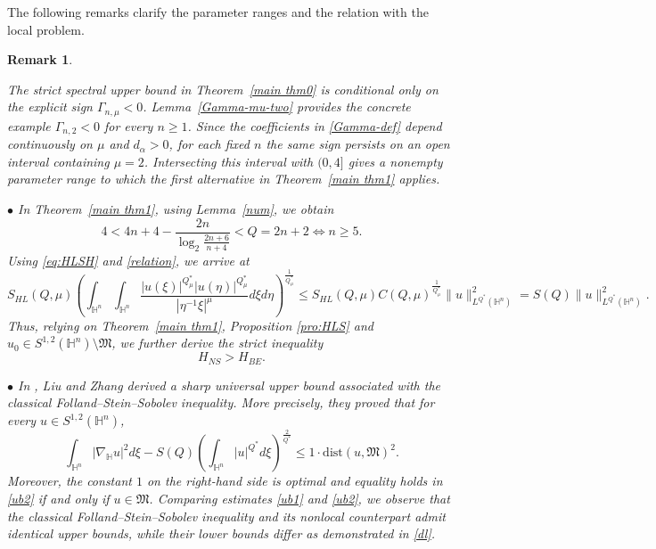 \documentclass[10pt,a4paper]{amsart}
\newtheorem{remark}{Remark}[section]
\begin{document}
{The following remarks clarify the parameter ranges and the relation with the local problem.}
\begin{remark}\label{rmk2}
{\rm
{The strict spectral upper bound in Theorem~\ref{main thm0} is conditional only on the explicit sign $\Gamma_{n,\mu}<0$. Lemma~\ref{Gamma-mu-two} provides the concrete example $\Gamma_{n,2}<0$ for every $n\ge1$. Since the coefficients in \eqref{Gamma-def} depend continuously on $\mu$ and $d_\alpha>0$, for each fixed $n$ the same sign persists on an open interval containing $\mu=2$. Intersecting this interval with $(0,4]$ gives a nonempty parameter range to which the first alternative in Theorem~\ref{main thm1} applies.}

$\bullet$ In Theorem~\ref{main thm1}, using Lemma~\ref{num}, we obtain
\begin{equation*}
 4<4n+4-\frac{2n}{\log_2 \frac{2n+6}{n+4}}<Q=2n+2\Longleftrightarrow n\geq5.
\end{equation*}
Using \eqref{eq:HLSH} and \eqref{relation}, we arrive at
\begin{equation*}
 S_{HL}(Q,\mu) \left(\int_{\mathbb{H}^{n}}\int_{\mathbb{H}^{n}}\frac{|u(\xi)|^{Q^{\ast}_{\mu}}|u(\eta)|
^{Q^{\ast}_{\mu}}}{|\eta^{-1}\xi|^{\mu}}{d}\xi{d}\eta\right)^{\frac{1}{Q^{\ast}_{\mu}}}\leq
S_{HL}(Q,\mu) C(Q,\mu)^{\frac{1}{Q^{\ast}_{\mu}}} \|u\|_{L^{Q^{\ast}}(\mathbb{H}^n)}^2=S(Q)\|u\|_{L^{Q^{\ast}}(\mathbb{H}^n)}^2.
\end{equation*}
Thus, relying on Theorem~\ref{main thm1}, Proposition \ref{pro:HLS} and $u_0\in S^{1,2}(\mathbb{H}^{n})\setminus \mathfrak{M}$, we further derive the strict inequality
\begin{equation}\label{dl}
 H_{NS}>H_{BE}.
\end{equation}


$\bullet$ In \cite{LZ15}, Liu and Zhang derived a sharp universal upper bound associated with the classical Folland--Stein--Sobolev inequality. More precisely, they proved that
for every $u\in S^{1,2}(\mathbb{H}^{n})$,
\begin{equation}\label{ub2}
 \int_{\mathbb{H}^{n}}|\nabla_{\mathbb{H}} u|^{2}{d}\xi-S(Q)\left(\int_{\mathbb{H}^{n}}|u|^{Q^{\ast}}d\xi\right)^{\frac{2}{Q^{\ast}}}\leq 1\cdot \mathrm{dist}(u,\mathfrak{M})^2.
\end{equation}
Moreover, the constant $1$ on the right-hand side is optimal and equality holds in \eqref{ub2} if and only if $u\in \mathfrak{M}$. Comparing estimates \eqref{ub1} and \eqref{ub2}, we observe that the classical Folland--Stein--Sobolev inequality and its nonlocal counterpart admit identical upper bounds, while their lower bounds differ as demonstrated in \eqref{dl}.
}
\end{remark}
\end{document}

